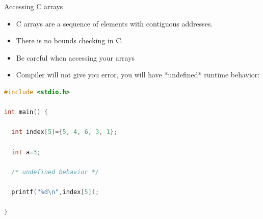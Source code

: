 \documentclass[10pt,t]{beamer}
\begin{document}
\begin{frame}[fragile]{Accessing C arrays}
  \begin{itemize}
  \item C arrays are a sequence of elements with contiguous addresses.
  \item There is no bounds checking in C.
  \item Be careful when accessing your arrays
  \item Compiler will not give you error, you will have *undefined* runtime behavior:
  \end{itemize}
  \begin{lstlisting}[language=C,basicstyle=\scriptsize\ttfamily]
#include <stdio.h>

int main() {
  
  int index[5]={5, 4, 6, 3, 1};
  
  int a=3;
  
  /* undefined behavior */
  
  printf("%d\n",index[5]);
  
}
  \end{lstlisting}
\end{frame}
\end{document}
